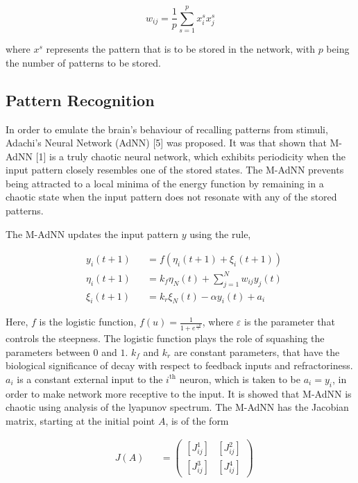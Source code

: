 \documentclass[12pt, letterpaper]{article}
\begin{document}
$$
w_{ij} = \frac{1}{p} \sum_{s=1}^p x_i^s x_j^s
$$

where $x^s$ represents the pattern that is to be stored in the network, with $p$ being the number of patterns to be stored.

\subsection*{Pattern Recognition}

In order to emulate the brain's behaviour of recalling patterns from stimuli, Adachi’s Neural Network (AdNN) [5] was proposed. It was that shown that M-AdNN [1] is a truly chaotic neural network, which exhibits periodicity when the input pattern closely resembles one of the stored states. The M-AdNN prevents being attracted to a local minima of the energy function by remaining in a chaotic state when the input pattern does not resonate with any of the stored patterns.

The M-AdNN updates the input pattern $y$ using the rule,

$$
\begin{aligned}
& y_i(t+1) &&= f(\eta_i(t+1) + \xi_i(t+1))\\
& \eta_i(t+1) &&= k_f \eta_N(t) + \sum_{j = 1}^N w_{ij} y_j(t)\\
& \xi_i(t+1) &&= k_r \xi_N(t) - \alpha y_i(t) + a_i
\end{aligned}
$$

Here, $f$ is the logistic function, $f(u) = \frac{1}{1 + e^\frac{-u}{\varepsilon}}$, where $\varepsilon$ is the parameter that controls the steepness. The logistic function plays the role of squashing the parameters between $0$ and $1$. $k_f$ and $k_r$ are constant parameters, that have the biological significance of decay with respect to feedback inputs and refractoriness. $a_i$ is a constant external input to the $i^{\text{th}}$ neuron, which is taken to be $a_i = y_i$, in order to make network more receptive to the input. It is showed that M-AdNN is chaotic using analysis of the lyapunov spectrum. The M-AdNN has the Jacobian matrix, starting at the initial point $A$, is of the form

$$
\begin{aligned}
& J(A) &&= \begin{pmatrix}
  [J_{ij}^1] & [J_{ij}^2]\\
  [J_{ij}^3] & [J_{ij}^4]
  \end{pmatrix}\\
\end{aligned}
$$
\end{document}
